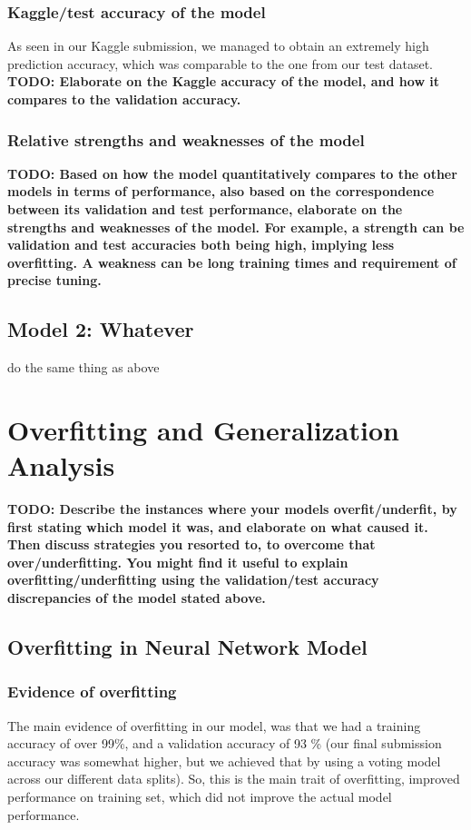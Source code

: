 \documentclass[10pt]{article} %
\begin{document}
\subsubsection{Kaggle/test accuracy of the model}
As seen in our Kaggle submission, we managed to obtain an extremely high prediction accuracy, which was comparable to the one from our test dataset.
\textbf{TODO: Elaborate on the Kaggle accuracy of the model, and how it compares to the validation accuracy.}
\subsubsection{Relative strengths and weaknesses of the model}
\textbf{TODO: Based on how the model quantitatively compares to the other models in terms of performance, also based on the correspondence between its validation and test performance, elaborate on the strengths and weaknesses of the model. For example, a strength can be validation and test accuracies both being high, implying less overfitting. A weakness can be long training times and requirement of precise tuning.}
\subsection{Model 2: Whatever}
do the same thing as above

\section{Overfitting and Generalization Analysis}
\textbf{TODO: Describe the instances where your models overfit/underfit, by first stating which model it was, and elaborate on what caused it. Then discuss strategies you resorted to, to overcome that over/underfitting. You might find it useful to explain overfitting/underfitting using the validation/test accuracy discrepancies of the model stated above.}
\subsection{Overfitting in Neural Network Model}
\subsubsection{Evidence of overfitting}
The main evidence of overfitting in our model, was that we had a training accuracy of over 99\%, and a validation accuracy of 93 \% (our final submission accuracy was somewhat higher, but we achieved that by using a voting model across our different data splits). So, this is the main trait of overfitting, improved performance on training set, which did not improve the actual model performance.
\end{document}
